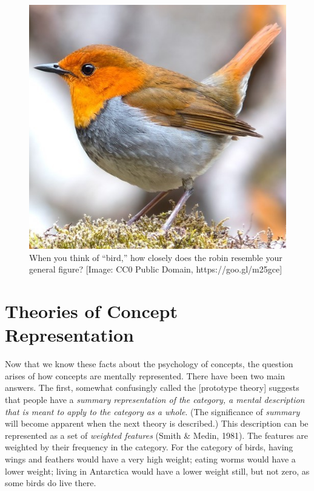 \documentclass[
]{krantz}
\begin{document}
\begin{figure}

{\centering \includegraphics[width=0.4\linewidth]{images/ch7/bird} 

}

\caption{When you think of “bird,” how closely does the robin resemble your general figure? [Image: CC0 Public Domain, https://goo.gl/m25gce]}\label{fig:bird}
\end{figure}

\hypertarget{theories-of-concept-representation}{%
\section{Theories of Concept Representation}\label{theories-of-concept-representation}}

Now that we know these facts about the psychology of concepts, the question arises of how concepts are mentally represented. There have been two main answers. The first, somewhat confusingly called the {[}prototype theory{]} suggests that people have a \emph{summary representation of the category, a mental description that is meant to apply to the category as a whole}. (The significance of \emph{summary} will become apparent when the next theory is described.) This description can be represented as a set of \emph{weighted features} (Smith \& Medin, 1981). The features are weighted by their frequency in the category. For the category of birds, having wings and feathers would have a very high weight; eating worms would have a lower weight; living in Antarctica would have a lower weight still, but not zero, as some birds do live there.
\end{document}
